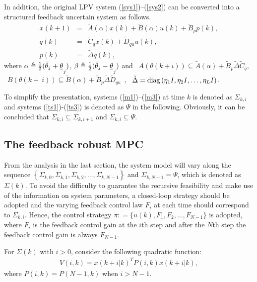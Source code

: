 \documentclass{singlecol-new}
\theoremstyle{TH}{
\newtheorem{lemma}{Lemma}
\newtheorem{theorem}[lemma]{Theorem}
\newtheorem{corrolary}[lemma]{Corrolary}
\newtheorem{conjecture}[lemma]{Conjecture}
\newtheorem{proposition}[lemma]{Proposition}
\newtheorem{claim}[lemma]{Claim}
\newtheorem{stheorem}[lemma]{Wrong Theorem}
\newtheorem{algorithm}{Algorithm}
}
\theoremstyle{THrm}{
\newtheorem{definition}{Definition}[section]
\newtheorem{question}{Question}[section]
\newtheorem{remark}{Remark}
\newtheorem{scheme}{Scheme}
}
\theoremstyle{THhit}{
\newtheorem{case}{Case}[section]
}
\begin{document}
In addition, the original LPV system (\ref{sys1})--(\ref{sys2}) can
be converted into a structured feedback uncertain system as follows.
\begin{eqnarray}\label{ts1}
x(k + 1) &=& \tilde A(\alpha )x(k) + \tilde B(\alpha )u(k) + \tilde
B_p p(k),\\\label{ts2} q(k) &=& \tilde C_q x(k) + \tilde D_{qu}
u(k),\\\label{ts3} p(k) &=& \tilde \Delta q(k),
\end{eqnarray}
where $\alpha  \triangleq \frac{1} {2}(\bar \theta _j  +
\underset{\raise0.3em\hbox{$\smash{\scriptscriptstyle-}$}}{\theta}_j)$,
$\beta  \triangleq \frac{1} {2}(\bar \theta _j  -
\underset{\raise0.3em\hbox{$\smash{\scriptscriptstyle-}$}}{\theta}_j)$
and ~$ A(\theta (k + i)) \subseteq \tilde A(\alpha) + \tilde B_p
\tilde \Delta \tilde C_q$, ~$ B(\theta (k +~i)) \subseteq \tilde
B(\alpha) + \tilde B_p \tilde \Delta \tilde D_{qu}$~, ~$ \tilde
\Delta  = {\rm diag}\left( {\eta _1 I,\eta _2 I, \ldots ,\eta _L I}
\right)$.

To simplify the presentation, systems (\ref{m1})--(\ref{m3}) at time
$k$ is denoted as $\Sigma _{k,i}$ and systems
(\ref{ts1})-(\ref{ts3}) is denoted as $\Psi $ in the following.
Obviously, it can be concluded that $\Sigma _{k,i} \subseteq \Sigma
_{k,i + 1} $ and $\Sigma _{k,i} \subseteq \Psi $.

\subsection{The feedback robust MPC}

From the analysis in the last section, the system model will vary
along the sequence $\left\{{\Sigma _{k,0} ,\Sigma _{k,1} ,\Sigma
_{k,2},\ldots,\Sigma _{k,N - 1}} \right\} $ and $\Sigma
_{k,N-1}=\Psi$, which is denoted as $\Sigma (k)$. To avoid the
difficulty to guarantee the recursive feasibility and make use of
the information on system parameters, a closed-loop strategy should
be adopted and the varying feedback control law $F_i$ at each time
should correspond to $\Sigma _{k,i} $. Hence, the control strategy
\h{$\pi : = \{ u(k),F_1 ,F_2 , \ldots ,F_{N - 1} \}$} is adopted,
where $F_i $ is the feedback control gain at the $i$th step and
after the $N$th step the feedback control gain is always $F_{N - 1}
$.

For $\Sigma (k)$ with $i>0$, consider the following quadratic
function:
\begin{eqnarray*}
V(i,k) = x(k + i|k)^T P(i,k)x(k + i|k),\nonumber
\end{eqnarray*}
where $P(i,k) = P(N - 1,k)$ when $i > N - 1$.
\end{document}
